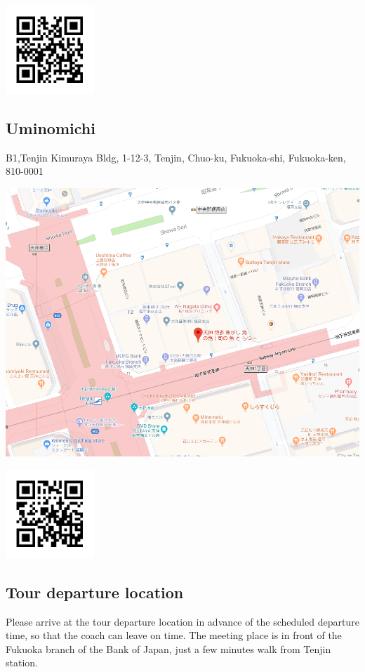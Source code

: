 \includegraphics[width=0.25\textwidth]{google_map01_qr.png}

\newpage
\subsection*{Uminomichi}
B1,Tenjin Kimuraya Bldg, 1-12-3, Tenjin, Chuo-ku, Fukuoka-shi, Fukuoka-ken, 810-0001

\noindent\includegraphics[width=\textwidth]{uminomichi.png}

\includegraphics[width=0.25\textwidth]{uminomichi_qr.png}

\newpage
\subsection*{Tour departure location}

Please arrive at the tour departure location in advance of the scheduled departure time, so that the
coach can leave on time.   
The meeting place is in front of the Fukuoka branch of the Bank of Japan, just a few minutes walk from Tenjin station.

